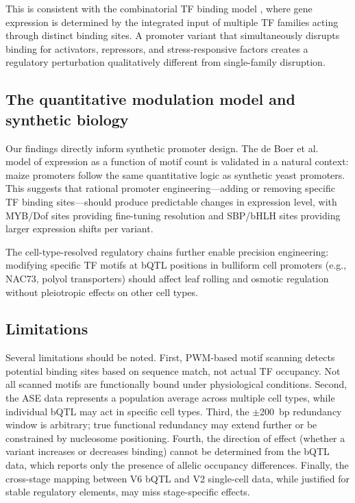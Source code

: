 \documentclass[11pt,a4paper]{article}
\begin{document}
This is consistent with the combinatorial TF binding model \citep{spitz2012}, where gene expression is determined by the integrated input of multiple TF families acting through distinct binding sites. A promoter variant that simultaneously disrupts binding for activators, repressors, and stress-responsive factors creates a regulatory perturbation qualitatively different from single-family disruption.

\subsection{The quantitative modulation model and synthetic biology}

Our findings directly inform synthetic promoter design. The de Boer et al.\ \citep{deboer2020} model of expression as a function of motif count is validated in a natural context: maize promoters follow the same quantitative logic as synthetic yeast promoters. This suggests that rational promoter engineering---adding or removing specific TF binding sites---should produce predictable changes in expression level, with MYB/Dof sites providing fine-tuning resolution and SBP/bHLH sites providing larger expression shifts per variant.

The cell-type-resolved regulatory chains further enable precision engineering: modifying specific TF motifs at bQTL positions in bulliform cell promoters (e.g., NAC73, polyol transporters) should affect leaf rolling and osmotic regulation without pleiotropic effects on other cell types.

\subsection{Limitations}

Several limitations should be noted. First, PWM-based motif scanning detects potential binding sites based on sequence match, not actual TF occupancy. Not all scanned motifs are functionally bound under physiological conditions. Second, the ASE data represents a population average across multiple cell types, while individual bQTL may act in specific cell types. Third, the $\pm$200~bp redundancy window is arbitrary; true functional redundancy may extend further or be constrained by nucleosome positioning. Fourth, the direction of effect (whether a variant increases or decreases binding) cannot be determined from the bQTL data, which reports only the presence of allelic occupancy differences. Finally, the cross-stage mapping between V6 bQTL and V2 single-cell data, while justified for stable regulatory elements, may miss stage-specific effects.
\end{document}
